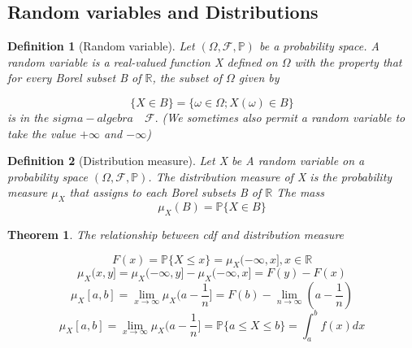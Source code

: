 \documentclass[a4]{article}
\newtheorem{theorem}{Theorem}
\newtheorem{definition}{Definition}
\begin{document}
\subsection{Random variables and Distributions}
\begin{definition}[Random variable]
	Let $(\Omega, \mathcal{F}, \mathbb{P})$ be a probability space. A random variable is a real-valued function X defined on $\Omega$ with the property that for every Borel subset B of $\mathbb{R}$, the subset of $\Omega$ given by \par 
	$$
	\{X\in B\} = \{\omega \in \Omega;X(\omega)\in B\}
	$$
	is in the $sigma-algebra\quad \mathcal{F}.$ (We sometimes also permit a random variable to take the value $+\infty$ and $-\infty$)
\end{definition}
\bigbreak
\begin{definition}[Distribution measure]
	Let X be A random variable on a probability space $(\Omega, \mathcal{F}, \mathbb{P})$. The distribution measure of X is the probability measure $\mu_{X}$ that assigns to each Borel subsets B of $\mathbb{R}$ The mass $$\mu_{X}(B) = \mathbb{P}\{X\in B\}$$
\end{definition}
\begin{theorem}
	The relationship between cdf and distribution measure\par 
	$$
	F(x) = \mathbb{P}\{X\leq x\} = \mu_{X}(-\infty, x], x\in \mathbb{R}
	$$
	$$
	\mu_{X}(x,y] = 	\mu_{X}(-\infty,y] - 	\mu_{X}(-\infty, x] = F(y) - F(x)
	$$
	$$
	\mu_{X}[a,b] = \lim_{x\rightarrow\infty}\mu_{X}(a-\frac{1}{n}] = F(b) - \lim_{n\rightarrow\infty}(a - \frac{1}{n})
	$$
	$$
	\mu_{X}[a,b] = \lim_{x\rightarrow\infty}\mu_{X}(a-\frac{1}{n}]  = \mathbb{P}\{a\leq X\leq b\} = \int_{a}^{b}f(x)dx
	$$
\end{theorem}
\end{document}

